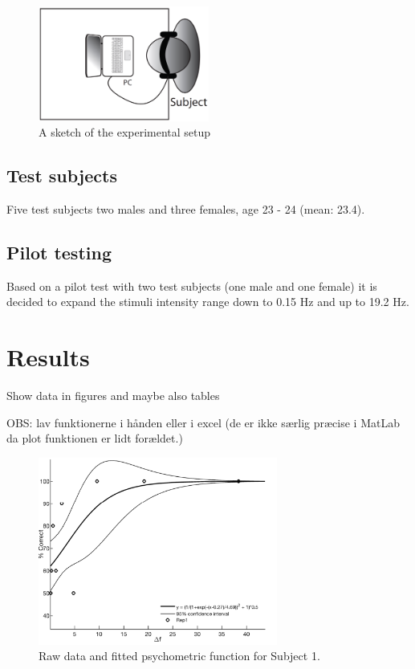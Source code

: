 \begin{figure}[H]
\centering
\includegraphics[width = 0.5\textwidth]{Figure/Vores_Figurer/experiment.png} 
\caption{A sketch of the experimental setup}
\label{fig:experiment}
\end{figure}

\subsection*{Test subjects}
%
Five test subjects two males and three females, age 23 - 24 (mean: 23.4).

\subsection*{Pilot testing}
%
Based on a pilot test with two test subjects (one male and one female) it is decided to expand the stimuli intensity range down to 0.15 Hz and up to 19.2 Hz.

\section*{Results}
Show data in figures and maybe also tables

OBS: lav funktionerne i hånden eller i excel (de er ikke særlig præcise i MatLab da plot funktionen er lidt forældet.)

\begin{figure}[H]
\centering
\includegraphics[width = 0.7\textwidth]{Figure/Vores_Figurer/Subject1} 
\caption{Raw data and fitted psychometric function for Subject 1.}
\label{fig:Subject1}
\end{figure}

